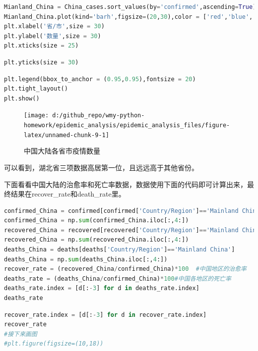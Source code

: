\documentclass[UTF8,a4paper,12pt]{ctexart}  %
\begin{document}
\begin{lstlisting}[language=Python]
Mianland_China = China_cases.sort_values(by='confirmed',ascending=True)
Mianland_China.plot(kind='barh',figsize=(20,30),color = ['red','blue','lime'],width = 1,rot = 2)
plt.xlabel('省/市',size = 30)
plt.ylabel('数量',size = 30)
plt.xticks(size = 25)
\end{lstlisting}

\begin{lstlisting}[language=Python]
plt.yticks(size = 30)
\end{lstlisting}

\begin{lstlisting}[language=Python]
plt.legend(bbox_to_anchor = (0.95,0.95),fontsize = 20)
plt.tight_layout()
plt.show()
\end{lstlisting}

\begin{figure}

{\centering \texttt{[image: d:/github\_repo/wmy-python-homework/epidemic\_analysis/epidemic\_analysis\_files/figure-latex/unnamed-chunk-9-1]} 

}

\caption{中国大陆各省市疫情数量}\label{fig:unnamed-chunk-9}
\end{figure}

可以看到，湖北省三项数据高居第一位，且远远高于其他省份。

下面看看中国大陆的治愈率和死亡率数据，数据使用下面的代码即可计算出来，最终结果在recover\_rate和death\_rate里。

\begin{lstlisting}[language=Python]
confirmed_China = confirmed[confirmed['Country/Region']=='Mainland China']
confirmed_China = np.sum(confirmed_China.iloc[:,4:])
recovered_China = recovered[recovered['Country/Region']=='Mainland China']
recovered_China = np.sum(recovered_China.iloc[:,4:])
deaths_China = deaths[deaths['Country/Region']=='Mainland China']
deaths_China = np.sum(deaths_China.iloc[:,4:])
recover_rate = (recovered_China/confirmed_China)*100  #中国地区的治愈率
deaths_rate = (deaths_China/confirmed_China)*100#中国各地区的死亡率
deaths_rate.index = [d[:-3] for d in deaths_rate.index]
deaths_rate
\end{lstlisting}

\begin{lstlisting}[language=Python]
recover_rate.index = [d[:-3] for d in recover_rate.index]
recover_rate
#接下来画图
#plt.figure(figsize=(10,18))
\end{lstlisting}
\end{document}
